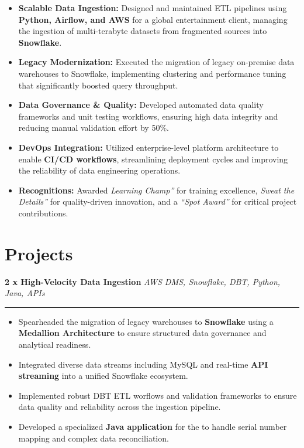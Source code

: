 \begin{itemize}[leftmargin=0.5cm]
\item \textbf{Scalable Data Ingestion:} Designed and maintained ETL pipelines using \textbf{Python, Airflow, and AWS} for a global entertainment client, managing the ingestion of multi-terabyte datasets from fragmented sources into \textbf{Snowflake}.
\item \textbf{Legacy Modernization:} Executed the migration of legacy on-premise data warehouses to Snowflake, implementing clustering and performance tuning that significantly boosted query throughput.
\item \textbf{Data Governance \& Quality:} Developed automated data quality frameworks and unit testing workflows, ensuring high data integrity and reducing manual validation effort by 50\%.
\item \textbf{DevOps Integration:} Utilized enterprise-level platform architecture to enable \textbf{CI/CD workflows}, streamlining deployment cycles and improving the reliability of data engineering operations.
\item \textbf{Recognitions:} Awarded \textit{Learning Champ''} for training excellence, \textit{Sweat the Details''} for quality-driven innovation, and a \textit{``Spot Award''} for critical project contributions.
\end{itemize}

\section*{Projects}
\vspace{0.3cm}

\noindent \textbf{2 x High-Velocity Data Ingestion} \hfill \textit{AWS DMS, Snowflake, DBT, Python, Java, APIs}
\hrule
\begin{itemize}[leftmargin=0.5cm, nosep]
    \item Spearheaded the migration of legacy warehouses to \textbf{Snowflake} using a \textbf{Medallion Architecture} to ensure structured data governance and analytical readiness.
    \item Integrated diverse data streams including MySQL and real-time \textbf{API streaming} into a unified Snowflake ecosystem.
    \item Implemented robust DBT ETL worflows and validation frameworks to ensure data quality and reliability across the ingestion pipeline.
    \item Developed a specialized \textbf{Java application} for the to handle serial number mapping and complex data reconciliation.
\end{itemize}

